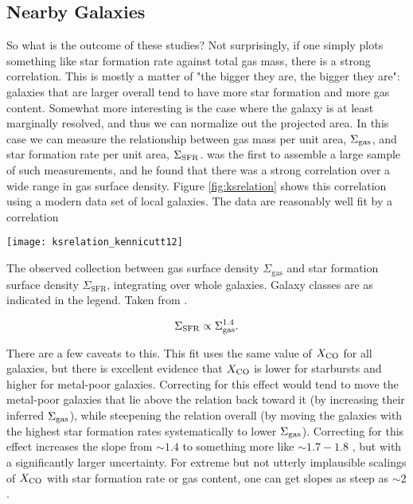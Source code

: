 \subsection{Nearby Galaxies}

So what is the outcome of these studies? Not surprisingly, if one simply plots something like star formation rate against total gas mass, there is a strong correlation. This is mostly a matter of "the bigger they are, the bigger they are": galaxies that are larger overall tend to have more star formation and more gas content. Somewhat more interesting is the case where the galaxy is at least marginally resolved, and thus we can normalize out the projected area. In this case we can measure the relationship between gas mass per unit area, $\Sigma_{\rm gas}$, and star formation rate per unit area, $\Sigma_{\rm SFR}$. \citet{kennicutt98a} was the first to assemble a large sample of such measurements, and he found that there was a strong correlation over a wide range in gas surface density. Figure \ref{fig:ksrelation} shows this correlation using a modern data set of local galaxies. The data are reasonably well fit by a correlation
\begin{marginfigure}
\texttt{[image: ksrelation\_kennicutt12]}
\caption[Whole-galaxy Kennicutt-Schmidt relation]{
\label{fig:ksrelation}
The observed collection between gas surface density $\Sigma_{\mathrm{gas}}$ and star formation surface density $\Sigma_{\mathrm{SFR}}$, integrating over whole galaxies. Galaxy classes are as indicated in the legend. Taken from \citet{kennicutt12a}.
}
\end{marginfigure}

\begin{equation}
\Sigma_{\rm SFR} \propto \Sigma_{\rm gas}^{1.4}.
\end{equation}

There are a few caveats to this. This fit uses the same value of $X_{\rm CO}$ for all galaxies, but there is excellent evidence that $X_{\rm CO}$ is lower for starbursts and higher for metal-poor galaxies. Correcting for this effect would tend to move the metal-poor galaxies that lie above the relation back toward it (by increasing their inferred $\Sigma_{\rm gas}$), while steepening the relation overall (by moving the galaxies with the highest star formation rates systematically to lower $\Sigma_{\rm gas}$). Correcting for this effect increases the slope from $\sim 1.4$ to something more like $\sim 1.7-1.8$ \citep[e.g.,][]{narayanan12a}, but with a significantly larger uncertainty. For extreme but not utterly implausible scalings of $X_{\rm CO}$ with star formation rate or gas content, one can get slopes as steep as $\sim 2$.

